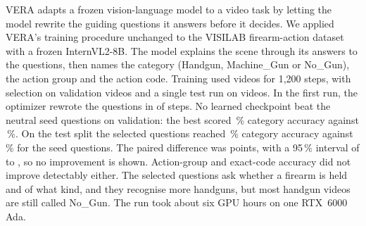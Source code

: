 VERA adapts a frozen vision-language model to a video task by letting the model rewrite the guiding questions it answers before it decides. We applied VERA's training procedure unchanged to the VISILAB firearm-action dataset with a frozen InternVL2-8B. The model explains the scene through its answers to the questions, then names the category (Handgun, Machine\_Gun or No\_Gun), the action group and the action code. Training used  videos for 1,200 steps, with selection on  validation videos and a single test run on  videos. In the first run, the optimizer rewrote the questions in  of  steps. No learned checkpoint beat the neutral seed questions on validation: the best scored \,\% category accuracy against \,\%. On the test split the selected questions reached \,\% category accuracy against \,\% for the seed questions. The paired difference was  points, with a 95\,\% interval of  to , so no improvement is shown. Action-group and exact-code accuracy did not improve detectably either. The selected questions ask whether a firearm is held and of what kind, and they recognise more handguns, but most handgun videos are still called No\_Gun. The run took about six GPU hours on one RTX~6000 Ada.
